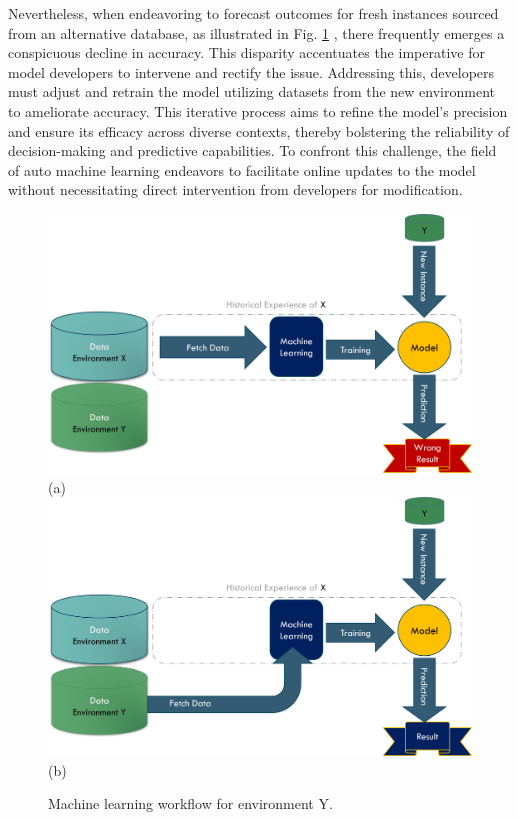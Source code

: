 Nevertheless, when endeavoring to forecast outcomes for fresh instances sourced from an alternative database, as illustrated in Fig. \ref{fig:machine-new-senario}
, there frequently emerges a conspicuous decline in accuracy. This disparity accentuates the imperative for model developers to intervene and rectify the issue. Addressing this, developers must adjust and retrain the model utilizing datasets from the new environment to ameliorate accuracy. This iterative process aims to refine the model's precision and ensure its efficacy across diverse contexts, thereby bolstering the reliability of decision-making and predictive capabilities. To confront this challenge, the field of auto machine learning endeavors to facilitate online updates to the model without necessitating direct intervention from developers for modification.

\begin{figure}[!ht]
    \centering
    \includegraphics[width=.8\textwidth]{1_introduction/figures/PNG/wrong_machine_flow_1.png}\\
    (a) \\
    \includegraphics[width=.8\textwidth]{1_introduction/figures/PNG/wrong_machine_flow_2.png}\\
    (b)
    \caption{Machine learning workflow for environment Y.}
    \label{fig:machine-new-senario}
\end{figure}



